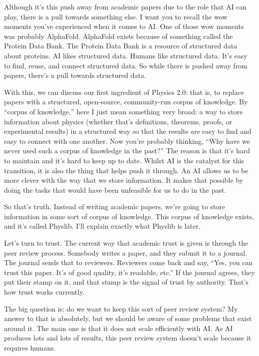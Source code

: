 \documentclass[11pt,a4paper]{article}
\begin{document}
Although it's this push away from academic papers due to the role that AI can play, there is a pull towards something else. I want you to recall the wow moments you've experienced when it comes to AI. One of those wow moments was probably AlphaFold. AlphaFold exists because of something called the Protein Data Bank. The Protein Data Bank is a resource of structured data about proteins. AI likes structured data. Humans like structured data. It's easy to find, reuse, and connect structured data. So while there is pushed away from papers, there's a pull towards structured data.

With this, we can discuss our first ingredient of Physics 2.0: that is, to replace papers with a structured, open-source, community-run corpus of knowledge. By ``corpus of knowledge,'' here I just mean something very broad: a way to store information about physics (whether that's definitions, theorems, proofs, or experimental results) in a structured way so that the results are easy to find and easy to connect with one another. Now you're probably thinking, ``Why have we never used such a corpus of knowledge in the past?'' The reason is that it's hard to maintain and it's hard to keep up to date. Whilst AI is the catalyst for this transition, it is also the thing that helps push it through. An AI allows us to be more clever with the way that we store information. It makes that possible by doing the tasks that would have been unfeasible for us to do in the past.

So that's truth. Instead of writing academic papers, we're going to store information in some sort of corpus of knowledge. This corpus of knowledge exists, and it's called Physlib. I'll explain exactly what Physlib is later.

Let's turn to trust. The current way that academic trust is given is through the peer review process. Somebody writes a paper, and they submit it to a journal. The journal sends that to reviewers. Reviewers come back and say, ``Yes, you can trust this paper. It's of good quality, it's readable, etc.'' If the journal agrees, they put their stamp on it, and that stamp is the signal of trust by authority. That's how trust works currently.

The big question is: do we want to keep this sort of peer review system? My answer to that is absolutely, but we should be aware of some problems that exist around it. The main one is that it does not scale efficiently with AI. As AI produces lots and lots of results, this peer review system doesn't scale because it requires humans.
\end{document}
